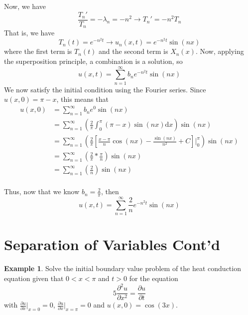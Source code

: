 \documentclass[11pt]{article}
\theoremstyle{plain} %
\theoremstyle{definition}
\theoremstyle{example}
\newtheorem*{example}{Example}
\theoremstyle{remark}
\begin{document}
Now, we have $$\frac{T_n'}{T_n} = -\lambda_n = -n^2 \rightarrow T_n' = -n^2T_n$$ That is, we have 
$$T_n(t) = e^{-n^2t} \rightarrow u_n(x,t) = e^{-n^2t}\sin(nx)$$ where the first term is $T_n(t)$ and the second term is $X_n(x)$. Now, applying the superposition principle, a combination is a solution, so $$u(x,t) = \sum_{n=1}^{\infty}b_ne^{-n^2t}\sin(nx)$$
We now satisfy the initial condition using the Fourier series. Since $u(x,0) = \pi -x$, this means that 
\begin{align*}
u(x,0) &= \sum_{n=1}^{\infty}b_ne^0\sin(nx) \\
&= \sum_{n=1}^{\infty}\left(\frac{2}{\pi}\int_0^{\pi}(\pi - x)\sin(nx) \mathrm d x\right)\sin(nx) \\
&= \sum_{n=1}^{\infty}\left(\frac{2}{\pi}\left[\frac{x - \pi}{n}\cos(nx) - \frac{\sin(nx)}{n^2} + C\right]\Big|_0^{\pi}\right)\sin(nx) \\
&= \sum_{n=1}^{\infty}\left(\frac{2}{\pi}*\frac{\pi}{n}\right)\sin(nx) \\
&= \sum_{n=1}^{\infty}\left(\frac{2}{n}\right)\sin(nx) \\
\end{align*}

Thus, now that we know $b_n = \frac{2}{\pi}$, then
$$u(x,t) = \sum_{n=1}^{\infty} \frac{2}{n}e^{-n^2t}\sin(nx)$$

\section{Separation of Variables Cont'd}

\begin{example}
Solve the initial boundary value problem of the heat conduction equation given that $0 < x < \pi$ and $t > 0$ for the equation $$5\frac{\partial ^2 u}{\partial x^2} = \frac{\partial u}{\partial t}$$ with $\frac{\partial u}{\partial x}\Big|_{x=0}=0$, $\frac{\partial u}{\partial x}\Big|_{x=\pi}=0$ and $u(x,0) = \cos(3x)$.
\end{example}
\end{document}
